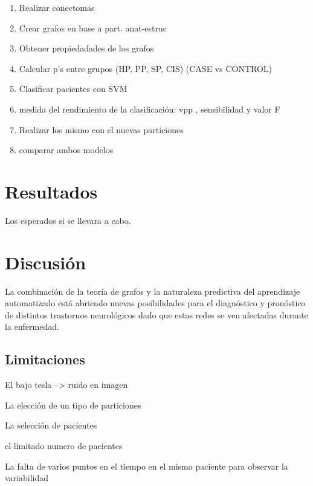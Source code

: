 \documentclass[fleqn,10pt]{UICArticle} %
\begin{document}
\begin{enumerate}[noitemsep]
\item Realizar conectomas
\item Crear grafos en base a part. anat-estruc
\item Obtener propiedadades de los grafos
\item Calcular p's entre grupos (HP, PP, SP, CIS) (CASE vs CONTROL) %
\item Clasificar pacientes con SVM
\item medida del rendimiento de la clasificación: vpp , sensibilidad y valor F
\item Realizar los mismo con el nuevas particiones
\item comparar ambos modelos
\end{enumerate}

\section{Resultados}
Los esperados si se llevara a cabo.

\section{Discusión}

La combinación de la teoría de grafos y la naturaleza predictiva del aprendizaje automatizado está abriendo nuevas posibilidades para el diagnóstico y pronóstico de distintos trastornos neurológicos dado que estas redes se ven afectadas durante la enfermedad. 


\subsection{Limitaciones}

\begin{list}{-}
\item El bajo tesla --> ruido en imagen
\item La elección de un tipo de particiones
\item La selección de pacientes
\item el limitado numero de pacientes
\item La falta de varios puntos en el tiempo en el mismo paciente para observar la variabilidad
\end{list}
\end{document}
